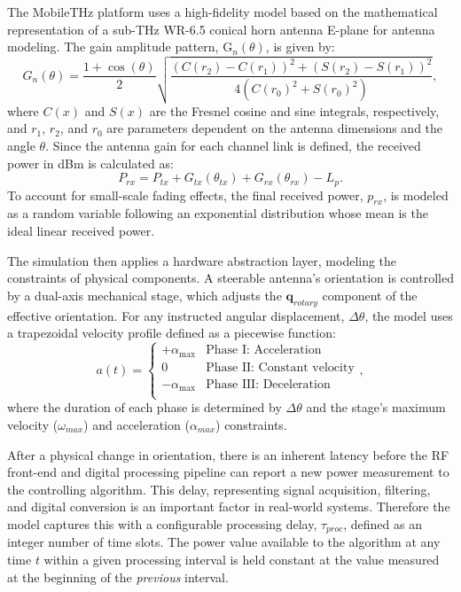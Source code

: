 \documentclass[fleqn,10pt]{wlscirep}
\begin{document}
The MobileTHz platform uses a high-fidelity model based on the mathematical representation of a sub-THz WR-6.5 conical horn antenna E-plane for antenna modeling. The gain amplitude pattern, $\text{G}_n(\theta)$, is given by:
\begin{equation}
    G_n(\theta) = \frac{1 + \cos(\theta)}{2} \sqrt{\frac{(C(r_2) - C(r_1))^2 + (S(r_2) - S(r_1))^2}{4(C(r_0)^2 + S(r_0)^2)}},
\end{equation}
where $C(x)$ and $S(x)$ are the Fresnel cosine and sine integrals, respectively, and $r_1$, $r_2$, and $r_0$ are parameters dependent on the antenna dimensions and the angle $\theta$. Since the antenna gain for each channel link is defined, the received power in dBm is calculated as:
\begin{equation}
P_{rx} = P_{tx} + G_{tx}(\theta_{tx}) + G_{rx}(\theta_{rx}) - L_p.
\end{equation}
To account for small-scale fading effects, the final received power, $p_{rx}$, is modeled as a random variable following an exponential distribution whose mean is the ideal linear received power.

The simulation then applies a hardware abstraction layer, modeling the constraints of physical components. A steerable antenna's orientation is controlled by a dual-axis mechanical stage, which adjusts the $\mathbf{q}_{rotary}$ component of the effective orientation. For any instructed angular displacement, $\Delta\theta$, the model uses a trapezoidal velocity profile defined as a piecewise function:
\begin{equation} \label{eq:accel_profile}
	a(t) =
	\begin{cases}
		+\alpha_{\text{max}} & \text{Phase I: Acceleration}       \\
		0               & \text{Phase II: Constant velocity} \\
		-\alpha_{\text{max}} & \text{Phase III: Deceleration}     \\
	\end{cases},
\end{equation}
where the duration of each phase is determined by $\Delta\theta$ and the stage's maximum velocity ($\omega_{max}$) and acceleration ($\alpha_{max}$) constraints.

After a physical change in orientation, there is an inherent latency before the RF front-end and digital processing pipeline can report a new power measurement to the controlling algorithm. This delay, representing signal acquisition, filtering, and digital conversion is an important factor in real-world systems. Therefore the model captures this with a configurable processing delay, $\tau_{proc}$, defined as an integer number of time slots. The power value available to the algorithm at any time $t$ within a given processing interval is held constant at the value measured at the beginning of the \textit{previous} interval.
\end{document}
